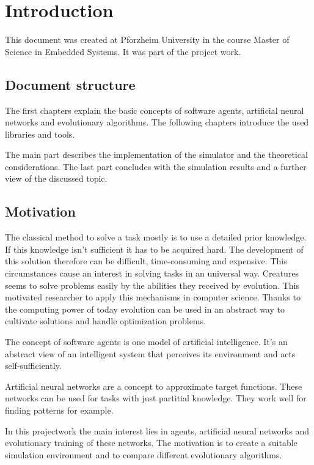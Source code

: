 \documentclass[10pt,a4paper,DIV=11]{scrreprt}
\begin{document}
\chapter{Introduction}
This document was created at Pforzheim University in the course Master of Science in Embedded Systems.
It was part of the project work.

\section{Document structure}
The first chapters explain the basic concepts of software agents, artificial neural networks and evolutionary algorithms.
The following chapters introduce the used libraries and tools.

The main part describes the implementation of the simulator and the theoretical considerations. The last part concludes with the simulation results and a further view of the discussed topic.

\section{Motivation}
The classical method to solve a task mostly is to use a detailed prior knowledge. If this knowledge isn't sufficient it has to be acquired hard. The development of this solution therefore can be difficult, time-consuming and expensive.
This circumstances cause an interest in solving tasks in an universal way. Creatures seems to solve problems easily by the abilities they received by evolution. This motivated researcher to apply this mechanisms in computer science. Thanks to the computing power of today evolution can be used in an abstract way to cultivate solutions and handle optimization problems.

The concept of software agents is one model of artificial intelligence. It's an abstract view of an intelligent system that perceives its environment and acts self-sufficiently.

Artificial neural networks are a concept to approximate target functions. These networks can be used for tasks with just partitial knowledge.
They work well for finding patterns for example.

In this projectwork the main interest lies in agents, artificial neural networks and evolutionary training of these networks.
The motivation is to create a suitable simulation environment and to compare different evolutionary algorithms.
\end{document}
